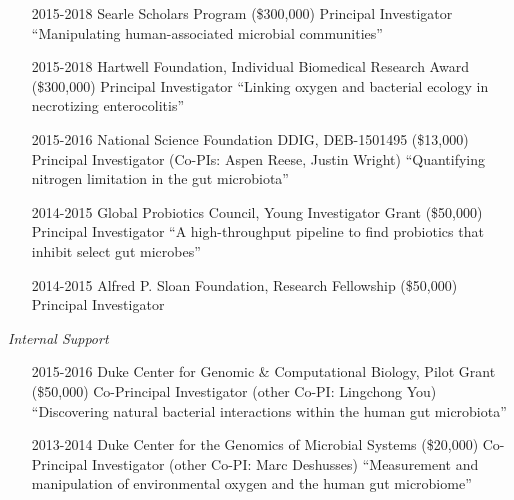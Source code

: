 \documentclass[overlapped,line,11pt]{res}
\begin{document}
\begin{resume}
\begin{itemize}[leftmargin=2cm, style=sameline]

\item[2015-2018] Searle Scholars Program (\$300,000) \newline Principal Investigator 
  \newline ``Manipulating human-associated microbial communities''

\item[2015-2018] Hartwell Foundation, Individual Biomedical Research Award (\$300,000) \newline Principal Investigator 
  \newline ``Linking oxygen and bacterial ecology in necrotizing enterocolitis''

\item[2015-2016] National Science Foundation DDIG, DEB-1501495 (\$13,000) \newline Principal Investigator (Co-PIs: Aspen Reese, Justin Wright) 
  \newline ``Quantifying nitrogen limitation in the gut microbiota''

\item[2014-2015] Global Probiotics Council, Young Investigator Grant (\$50,000) \newline Principal Investigator 
  \newline ``A high-throughput pipeline to find probiotics that
  inhibit select gut microbes''

\item[2014-2015] Alfred P. Sloan Foundation, Research Fellowship (\$50,000) \newline Principal Investigator 

\end{itemize}

\newpage
\emph{Internal Support}
\vspace{.1in}

\begin{itemize}[leftmargin=2cm, style=sameline]

\item[2015-2016] Duke Center for Genomic \& Computational Biology, Pilot Grant
  (\$50,000) \newline Co-Principal Investigator (other Co-PI:
  Lingchong You) \newline ``Discovering natural bacterial interactions
  within the human gut microbiota''

\item[2013-2014] Duke Center for the Genomics of Microbial Systems
  (\$20,000) \newline Co-Principal Investigator (other Co-PI:
  Marc Deshusses) \newline ``Measurement and manipulation of
environmental oxygen and the human gut microbiome''


\end{itemize}
\end{resume}
\end{document}
